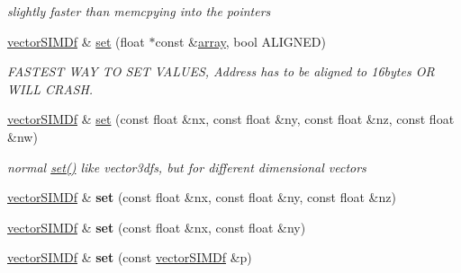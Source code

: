\begin{DoxyCompactItemize}
\begin{DoxyCompactList}\small\item\em slightly faster than memcpy\textquotesingle{}ing into the pointers \end{DoxyCompactList}\item 
\hyperlink{classirr_1_1core_1_1vectorSIMDf}{vector\+S\+I\+M\+Df} \& \hyperlink{classirr_1_1core_1_1vectorSIMDf_a1a581ff444487c90b32e1b7c830841cd}{set} (float $\ast$const \&\hyperlink{classirr_1_1core_1_1array}{array}, bool A\+L\+I\+G\+N\+ED)\hypertarget{classirr_1_1core_1_1vectorSIMDf_a1a581ff444487c90b32e1b7c830841cd}{}\label{classirr_1_1core_1_1vectorSIMDf_a1a581ff444487c90b32e1b7c830841cd}

\begin{DoxyCompactList}\small\item\em F\+A\+S\+T\+E\+ST W\+AY TO S\+ET V\+A\+L\+U\+ES, Address has to be aligned to 16bytes OR W\+I\+LL C\+R\+A\+SH. \end{DoxyCompactList}\item 
\hyperlink{classirr_1_1core_1_1vectorSIMDf}{vector\+S\+I\+M\+Df} \& \hyperlink{classirr_1_1core_1_1vectorSIMDf_a0078656e5d396b309fe64290abcd11b7}{set} (const float \&nx, const float \&ny, const float \&nz, const float \&nw)\hypertarget{classirr_1_1core_1_1vectorSIMDf_a0078656e5d396b309fe64290abcd11b7}{}\label{classirr_1_1core_1_1vectorSIMDf_a0078656e5d396b309fe64290abcd11b7}

\begin{DoxyCompactList}\small\item\em normal \hyperlink{classirr_1_1core_1_1vectorSIMDf_ab83cb199d2ce42b0baef98f030a6d066}{set()} like vector3df\textquotesingle{}s, but for different dimensional vectors \end{DoxyCompactList}\item 
\hyperlink{classirr_1_1core_1_1vectorSIMDf}{vector\+S\+I\+M\+Df} \& {\bfseries set} (const float \&nx, const float \&ny, const float \&nz)\hypertarget{classirr_1_1core_1_1vectorSIMDf_af5e153b0607789df4e75ad2e42e7f996}{}\label{classirr_1_1core_1_1vectorSIMDf_af5e153b0607789df4e75ad2e42e7f996}

\item 
\hyperlink{classirr_1_1core_1_1vectorSIMDf}{vector\+S\+I\+M\+Df} \& {\bfseries set} (const float \&nx, const float \&ny)\hypertarget{classirr_1_1core_1_1vectorSIMDf_aabcbf6679db35d13286ac17a179dee93}{}\label{classirr_1_1core_1_1vectorSIMDf_aabcbf6679db35d13286ac17a179dee93}

\item 
\hyperlink{classirr_1_1core_1_1vectorSIMDf}{vector\+S\+I\+M\+Df} \& {\bfseries set} (const \hyperlink{classirr_1_1core_1_1vectorSIMDf}{vector\+S\+I\+M\+Df} \&p)\hypertarget{classirr_1_1core_1_1vectorSIMDf_ac010effda14afca4f37620b21a57c1c1}{}\label{classirr_1_1core_1_1vectorSIMDf_ac010effda14afca4f37620b21a57c1c1}


\end{DoxyCompactItemize}

